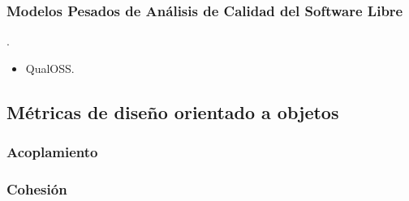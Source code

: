 \documentclass[11pt]{article}
\begin{document}
\subsubsection{Modelos Pesados de Análisis de Calidad del Software Libre}.
\begin{itemize}
\item{QualOSS}.
\end{itemize}

\subsection{Métricas de diseño orientado a objetos}

\subsubsection{Acoplamiento}
\subsubsection{Cohesión}
\end{document}
